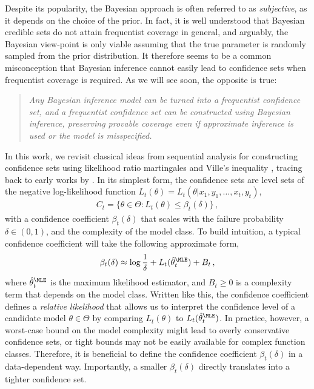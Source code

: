 Despite its popularity, the Bayesian approach is often referred to as \emph{subjective}, as it depends on the choice of the prior. In fact, it is well understood that Bayesian credible sets do not attain frequentist coverage in general, and arguably, the Bayesian view-point is only viable assuming that the true parameter is randomly sampled from the prior distribution. It therefore seems to be a common misconception that Bayesian inference cannot easily lead to confidence sets when frequentist coverage is required. As we will see soon, the opposite is true: 
\begin{quotation}
    \emph{Any Bayesian inference model can be turned into a frequentist confidence set, and a frequentist confidence set can be constructed using Bayesian inference, preserving provable coverage even if approximate inference is used or the model is misspecified.} 
\end{quotation}
In this work, we revisit classical ideas from sequential analysis \citep{wald1947sequential2} for constructing confidence sets using likelihood ratio martingales and Ville's inequality \citep{ville1939etude}, tracing back to early works by \citet{darling1968some,robbins1970statistical}. In its simplest form, the confidence sets are level sets of the negative log-likelihood function $L_t(\theta) = L_t(\theta|x_1,y_1,\dots, x_t, y_t)$,
\begin{align}
    C_t = \big\{\theta \in \Theta : L_t(\theta) \leq \beta_t(\delta)\big\} \,, \label{eq:level-set}
\end{align}
with a confidence coefficient $\beta_t(\delta)$ that scales with the failure probability $\delta \in (0,1)$, and the complexity of the model class. To build intuition, a typical confidence coefficient will take the following approximate form, 
$$\beta_t(\delta) \approx \log \frac{1}{\delta} + L_t(\hat \theta_t^{\MLE}) + B_t\,,$$ where $\hat \theta_t^{\MLE}$ is the maximum likelihood estimator, and $B_t \geq 0$ is a complexity term that depends on the model class. Written like this, the confidence coefficient defines a \emph{relative likelihood} that allows us to interpret the confidence level of a candidate model $\theta \in \Theta$ by comparing $L_t(\theta)$ to $L_t(\hat \theta_t^\MLE)$. In practice, however, a worst-case bound on the model complexity might lead to overly conservative confidence sets, or tight bounds may not be easily available for complex function classes. Therefore, it is beneficial to define the confidence coefficient $\beta_t(\delta)$ in a data-dependent way. Importantly, a smaller $\beta_t(\delta)$ directly translates into a tighter confidence set. 

